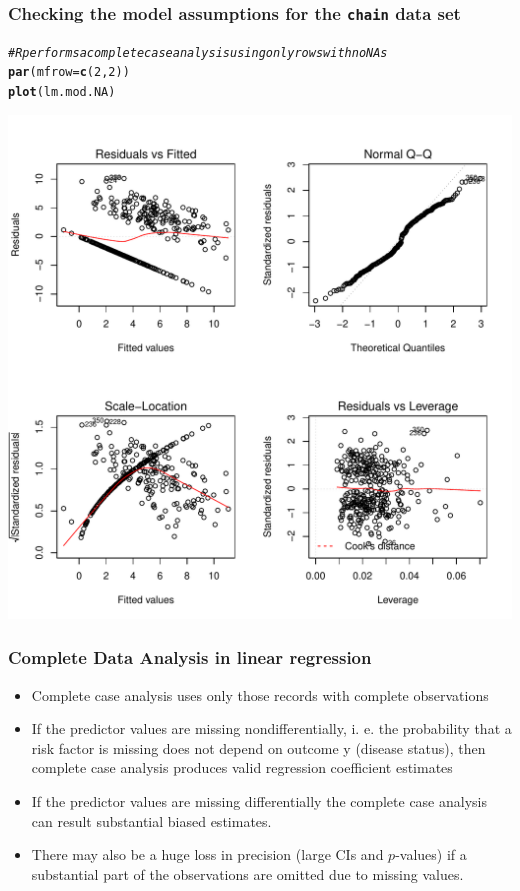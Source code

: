 \documentclass{beamer}\usepackage[]{graphicx}\usepackage[]{color}
\makeatletter
\newcommand{\hlnum}[1]{\textcolor[rgb]{0.686,0.059,0.569}{#1}}%
\newcommand{\hlcom}[1]{\textcolor[rgb]{0.678,0.584,0.686}{\textit{#1}}}%
\newcommand{\hlstd}[1]{\textcolor[rgb]{0.345,0.345,0.345}{#1}}%
\newcommand{\hlkwc}[1]{\textcolor[rgb]{0.333,0.667,0.333}{#1}}%
\newcommand{\hlkwd}[1]{\textcolor[rgb]{0.737,0.353,0.396}{\textbf{#1}}}%
\newenvironment{kframe}{%
 \def\at@end@of@kframe{}%
 \ifinner\ifhmode%
  \def\at@end@of@kframe{\end{minipage}}%
  \begin{minipage}{\columnwidth}%
 \fi\fi%
 \def\FrameCommand##1{\hskip\@totalleftmargin \hskip-\fboxsep
 \colorbox{shadecolor}{##1}\hskip-\fboxsep
     \hskip-\linewidth \hskip-\@totalleftmargin \hskip\columnwidth}%
 \MakeFramed {\advance\hsize-\width
   \@totalleftmargin\z@ \linewidth\hsize
   \@setminipage}}%
 {\par\unskip\endMakeFramed%
 \at@end@of@kframe}
\newenvironment{knitrout}{}{} %
\makeatother
\begin{document}
\begin{frame}[fragile]
\frametitle{Checking the model assumptions for the \texttt{chain} data set}
\begin{knitrout}\tiny
{}\color{fgcolor}\begin{kframe}
\begin{alltt}
\hlcom{# R performs a complete case analysis using only rows with no NAs}
\hlkwd{par}\hlstd{(}\hlkwc{mfrow}\hlstd{=}\hlkwd{c}\hlstd{(}\hlnum{2}\hlstd{,}\hlnum{2}\hlstd{))}
\hlkwd{plot}\hlstd{(lm.mod.NA)}
\end{alltt}
\end{kframe}

{\centering \includegraphics[width=0.7\linewidth]{figure/unnamed-chunk-6-1} 

}



\end{knitrout}
\end{frame}

\begin{frame}
\frametitle{Complete Data Analysis in linear regression}
\begin{itemize}
\item Complete case analysis uses only those records with complete observations
\item If the predictor values are missing nondifferentially, i. e. the probability
that a risk factor is missing does not depend on outcome y (disease status),
then complete case analysis produces valid regression coefficient estimates
\item If the predictor values are missing differentially the complete case
analysis can result substantial biased estimates.
\item There may also be a huge loss in precision (large CIs and $p$-values) if
a substantial part of the observations are omitted due to missing values.
\end{itemize}
\end{frame}
\end{document}
